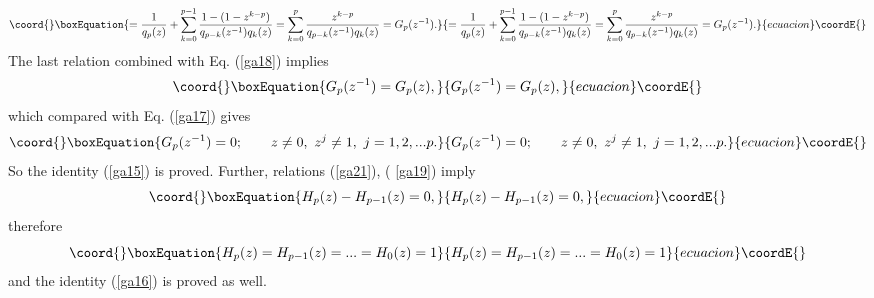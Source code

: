 \documentclass[a4paper,a4paper]{article}
\begin{document}
\begin{equation*}\coord{}\boxEquation{
=\frac{1}{q_{p}(z)}+\sum_{k=0}^{p-1}\frac{1-(1-z^{k-p})}{
q_{p-k}(z^{-1})q_{k}(z)}=\sum_{k=0}^{p}\frac{z^{k-p}}{q_{p-k}(z^{-1})q_{k}(z)
}=G_{p}(z^{-1}).
}{
=\frac{1}{q_{p}(z)}+\sum_{k=0}^{p-1}\frac{1-(1-z^{k-p})}{
q_{p-k}(z^{-1})q_{k}(z)}=\sum_{k=0}^{p}\frac{z^{k-p}}{q_{p-k}(z^{-1})q_{k}(z)
}=G_{p}(z^{-1}).
}{ecuacion}\coordE{}\end{equation*}%
The last relation combined with Eq. (\ref{ga18}) implies 
\begin{equation}\coord{}\boxEquation{
G_{p}(z^{-1})=G_{p}(z),  \label{ga20}
}{
G_{p}(z^{-1})=G_{p}(z),  }{ecuacion}\coordE{}\end{equation}%
which compared with Eq. (\ref{ga17}) gives 
\begin{equation}\coord{}\boxEquation{
G_{p}(z^{-1})=0;\qquad z\neq 0,\ z^{j}\neq 1,\ j=1,2,...p.  \label{ga21}
}{
G_{p}(z^{-1})=0;\qquad z\neq 0,\ z^{j}\neq 1,\ j=1,2,...p.  }{ecuacion}\coordE{}\end{equation}%
So the identity (\ref{ga15}) is proved. Further, relations (\ref{ga21}), (%
\ref{ga19}) imply 
\begin{equation}\coord{}\boxEquation{
H_{p}(z)-H_{p-1}(z)=0,  \label{ga22}
}{
H_{p}(z)-H_{p-1}(z)=0,  }{ecuacion}\coordE{}\end{equation}%
therefore 
\begin{equation}\coord{}\boxEquation{
H_{p}(z)=H_{p-1}(z)=...=H_{0}(z)=1  \label{ga23}
}{
H_{p}(z)=H_{p-1}(z)=...=H_{0}(z)=1  }{ecuacion}\coordE{}\end{equation}%
and the identity (\ref{ga16}) is proved as well.
\end{document}
